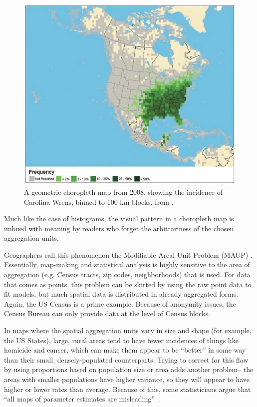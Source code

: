 \documentclass{article}\usepackage[]{graphicx}\usepackage[]{color}
\begin{document}
\begin{figure}[htbp]
\begin{centering}
\includegraphics[height=0.4\textheight]{img/wren}
\caption{A geometric choropleth map from 2008, showing the incidence of Carolina Wrens, binned to 100-km blocks, from \cite{SulTelWoo2008}.}\label{wren}
\end{centering}
\end{figure}


Much like the case of histograms, the visual pattern in a choropleth map is imbued with meaning by readers who forget the arbitrariness of the chosen aggregation units. 



Geographers call this phenomenon the Modifiable Areal Unit Problem (MAUP) \citep{Erv2015}. Essentially, map-making and statistical analysis is highly sensitive to the area of aggregation (e.g. Census tracts, zip codes, neighborhoods) that is used. For data that comes as points, this problem can be skirted by using the raw point data to fit models, but much spatial data is distributed in already-aggregated forms. Again, the US Census is a prime example. Because of anonymity issues, the Census Bureau can only provide data at the level of Census blocks. 

In maps where the spatial aggregation units vary in size and shape (for example, the US States), large, rural areas tend to have fewer incidences of things like homicide and cancer, which can make them appear to be ``better'' in some way than their small, densely-populated counterparts. Trying to correct for this flaw by using proportions based on population size or area adds another problem-- the areas with smaller populations have higher variance, so they will appear to have higher or lower rates than average. Because of this, some statisticians argue that ``all maps of parameter estimates are misleading''~\citep{GelPri1999}. 
\end{document}
